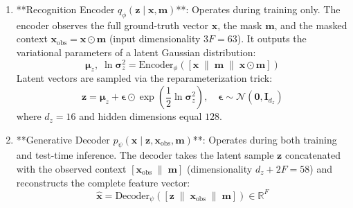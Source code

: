 \documentclass[11pt,a4paper]{report}
\begin{document}
\begin{enumerate}[label=\textbf{\arabic*.}]
  \item **Recognition Encoder $q_\phi(\mathbf{z} \mid \mathbf{x}, \mathbf{m})$**:
  Operates during training only. The encoder observes the full ground-truth vector $\mathbf{x}$, the mask $\mathbf{m}$, and the masked context $\mathbf{x}_{\text{obs}} = \mathbf{x} \odot \mathbf{m}$ (input dimensionality $3F = 63$). It outputs the variational parameters of a latent Gaussian distribution:
  \begin{equation}
    \boldsymbol{\mu}_z, \;\ln \boldsymbol{\sigma}_z^2 = \text{Encoder}_\phi([\mathbf{x} \;\parallel\; \mathbf{m} \;\parallel\; \mathbf{x} \odot \mathbf{m}])
  \end{equation}
  Latent vectors are sampled via the reparameterization trick:
  \begin{equation}
    \mathbf{z} = \boldsymbol{\mu}_z + \boldsymbol{\epsilon} \odot \exp\left(\frac{1}{2} \ln \boldsymbol{\sigma}_z^2\right), \quad \boldsymbol{\epsilon} \sim \mathcal{N}(\mathbf{0}, \mathbf{I}_{d_z})
  \end{equation}
  where $d_z = 16$ and hidden dimensions equal $128$.

  \item **Generative Decoder $p_\psi(\mathbf{x} \mid \mathbf{z}, \mathbf{x}_{\text{obs}}, \mathbf{m})$**:
  Operates during both training and test-time inference. The decoder takes the latent sample $\mathbf{z}$ concatenated with the observed context $[\mathbf{x}_{\text{obs}} \;\parallel\; \mathbf{m}]$ (dimensionality $d_z + 2F = 58$) and reconstructs the complete feature vector:
  \begin{equation}
    \hat{\mathbf{x}} = \text{Decoder}_\psi([\mathbf{z} \;\parallel\; \mathbf{x}_{\text{obs}} \;\parallel\; \mathbf{m}]) \in \mathbb{R}^F
  \end{equation}
\end{enumerate}
\end{document}
